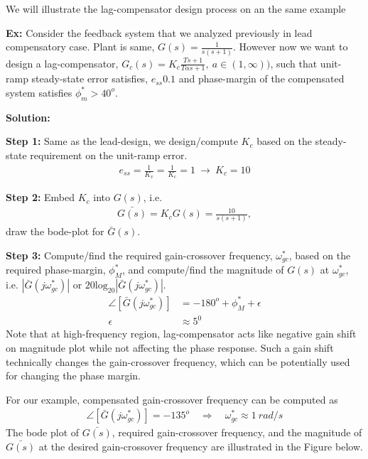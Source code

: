 \documentclass[twoside]{article}
\begin{document}
We will illustrate the lag-compensator design process on an the same example 

\vspace{6pt}

\textbf{Ex:} Consider the feedback system that we analyzed
previously in lead compensatory case. Plant is same, 
$G(s) = \frac{1}{s (s+1)}$. However now we want to
design a lag-compensator, $G_c(s) = K_c \frac{T s + 1}{T \alpha s + 1}
, \ a \in (1,\infty))$, such that unit-ramp steady-state error satisfies, $e_{ss}
0.1$ and phase-margin of the compensated system satisfies $\phi_m^*
> 40^o$. 

\textbf{Solution:}

\textbf{Step 1:} Same as the lead-design, we design/compute $K_c$ based on the steady-state 
requirement on the unit-ramp error.  
%
\begin{align}
   e_{ss} = \frac{1}{K_v} = \frac{1}{K_c} = 1 \ \rightarrow \ K_c = 10
\end{align}

\textbf{Step 2:} Embed $K_c$ into $G(s)$, i.e. 
%
\begin{align*}
  \bar{G(s)} = K_c G(s) = \frac{10}{s (s+1)} ,
\end{align*} 
%
draw the bode-plot for $\bar{G}(s)$. 

\textbf{Step 3:} Compute/find the required gain-crossover
frequency, $\omega_{gc}^*$, based on
the required phase-margin, $\phi^*_M$, and compute/find 
the magnitude of $G(s)$ at $\omega_{gc}^*$, i.e. 
$| \bar{G}(j  \omega_{gc}^*) | $ or $20 \mathrm{log}_20 | \bar{G}(j  \omega_{gc}^*) |$.
%
\begin{align*}
  \angle [ \bar{G}(j  \omega_{gc}^*) ] &= -180^o + \phi_M^* + \epsilon
  \\
  \epsilon &\approx 5^0
\end{align*}
%
Note that at high-frequency 
region, lag-compensator acts like negative gain 
shift on magnitude plot while not affecting the 
phase response. Such a gain shift technically 
changes the gain-crossover frequency, which
can be potentially used for changing the phase 
margin. 

For our example, compensated gain-crossover frequency can be computed as
%
\begin{align*}
  \angle [ \bar{G}(j  \omega_{gc}^*) ] = -135^o
  \quad \Rightarrow \quad \omega_{gc}^* \approx 1 \ rad/s
\end{align*}
%
The bode plot of $\bar{G(s)}$,
required gain-crossover frequency, and  
the magnitude of $\bar{G(s)}$ at the desired 
gain-crossover frequency are 
illustrated in the Figure below. 
\end{document}
